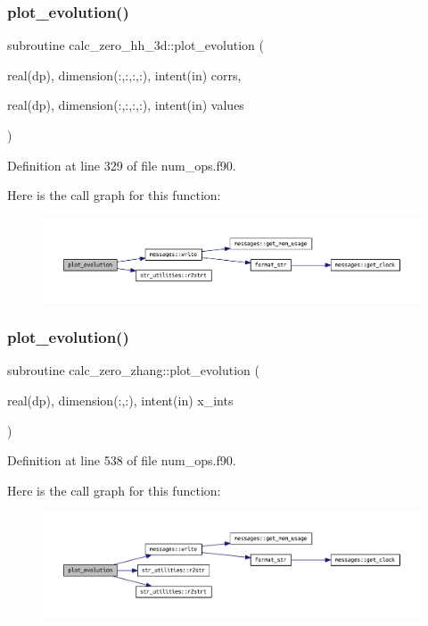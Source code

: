 \subsubsection{\texorpdfstring{plot\+\_\+evolution()}{plot\_evolution()}\hspace{0.1cm}{\footnotesize\ttfamily [2/3]}}
{\footnotesize\ttfamily subroutine calc\+\_\+zero\+\_\+hh\+\_\+3d\+::plot\+\_\+evolution (\begin{DoxyParamCaption}\item[{real(dp), dimension(\+:,\+:,\+:,\+:), intent(in)}]{corrs,  }\item[{real(dp), dimension(\+:,\+:,\+:,\+:), intent(in)}]{values }\end{DoxyParamCaption})}



Definition at line 329 of file num\+\_\+ops.\+f90.

Here is the call graph for this function\+:
\nopagebreak
\begin{figure}[H]
\begin{center}
\leavevmode
\includegraphics[width=350pt]{num__ops_8f90_a6a38b3677a2698fd1d3b59a9ee052fe1_cgraph}
\end{center}
\end{figure}
\mbox{\label{num__ops_8f90_aa37b5a8d2af52928606b47de8d3f7be2}} 
\subsubsection{\texorpdfstring{plot\+\_\+evolution()}{plot\_evolution()}\hspace{0.1cm}{\footnotesize\ttfamily [3/3]}}
{\footnotesize\ttfamily subroutine calc\+\_\+zero\+\_\+zhang\+::plot\+\_\+evolution (\begin{DoxyParamCaption}\item[{real(dp), dimension(\+:,\+:), intent(in)}]{x\+\_\+ints }\end{DoxyParamCaption})}



Definition at line 538 of file num\+\_\+ops.\+f90.

Here is the call graph for this function\+:
\nopagebreak
\begin{figure}[H]
\begin{center}
\leavevmode
\includegraphics[width=350pt]{num__ops_8f90_aa37b5a8d2af52928606b47de8d3f7be2_cgraph}
\end{center}
\end{figure}
